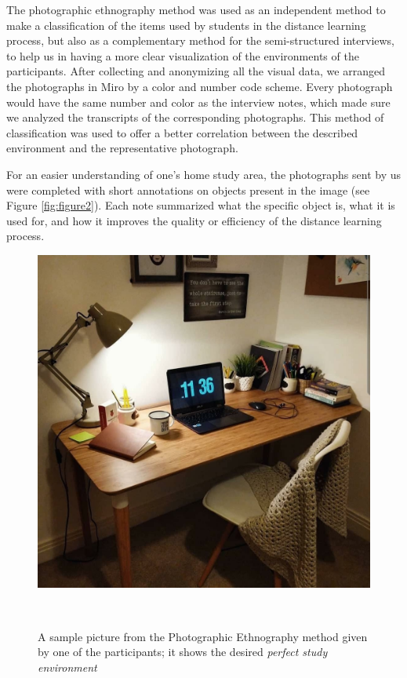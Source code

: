 \documentclass{sigchi}
\begin{document}
The photographic ethnography method was used as an independent method to make a classification of the items used by students in the distance learning process, but also as a complementary method for the semi-structured interviews, to help us in having a more clear visualization of the environments of the participants. After collecting and anonymizing all the visual data, we arranged the photographs in Miro by a color and number code scheme. Every photograph would have the same number and color as the interview notes, which made sure we analyzed the transcripts of the corresponding photographs. This method of classification was used to offer a better correlation between the described environment and the representative photograph.

For an easier understanding of one's home study area, the photographs sent by us were completed with short annotations on objects present in the image (see Figure \ref{fig:figure2}). Each note summarized what the specific object is, what it is used for, and how it improves the quality or efficiency of the distance learning process.

\begin{figure}
\centering
  \includegraphics[width=1\columnwidth]{figures/perfect-setup}
  \caption{A sample picture from the Photographic Ethnography method given by one of the participants; it shows the desired \emph{perfect study environment}}~\label{fig:figure3}
\end{figure}
\end{document}
